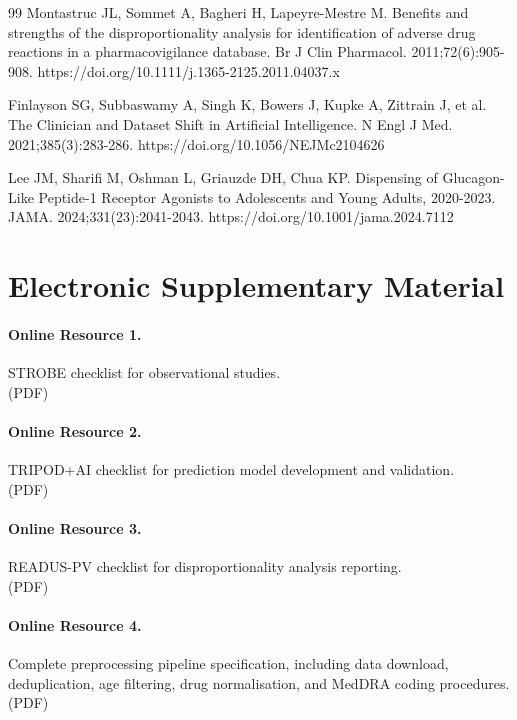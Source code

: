\documentclass[10pt,a4paper]{article}
\begin{document}
\begin{thebibliography}{99}
Montastruc JL, Sommet A, Bagheri H, Lapeyre-Mestre M.
Benefits and strengths of the disproportionality analysis for identification of adverse drug reactions in a pharmacovigilance database.
Br J Clin Pharmacol. 2011;72(6):905-908.
https://doi.org/10.1111/j.1365-2125.2011.04037.x

Finlayson SG, Subbaswamy A, Singh K, Bowers J, Kupke A, Zittrain J, et al.
The Clinician and Dataset Shift in Artificial Intelligence.
N Engl J Med. 2021;385(3):283-286.
https://doi.org/10.1056/NEJMc2104626

Lee JM, Sharifi M, Oshman L, Griauzde DH, Chua KP.
Dispensing of Glucagon-Like Peptide-1 Receptor Agonists to Adolescents and Young Adults, 2020-2023.
JAMA. 2024;331(23):2041-2043.
https://doi.org/10.1001/jama.2024.7112
\end{thebibliography}
\endgroup


\section*{Electronic Supplementary Material}

\paragraph*{Online Resource 1.}\label{s1tab} STROBE checklist for observational studies.\\
(PDF)

\paragraph*{Online Resource 2.}\label{s2tab} TRIPOD+AI checklist for prediction model development and validation.\\
(PDF)

\paragraph*{Online Resource 3.}\label{s3tab} READUS-PV checklist for disproportionality analysis reporting.\\
(PDF)

\paragraph*{Online Resource 4.}\label{s4tab} Complete preprocessing pipeline specification, including data download, deduplication, age filtering, drug normalisation, and MedDRA coding procedures.\\
(PDF)
\end{document}
